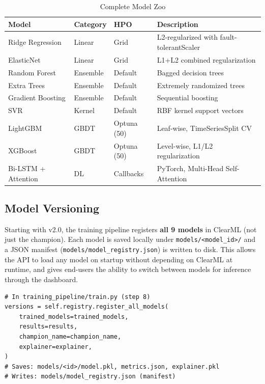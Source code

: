 \documentclass[12pt, a4paper, oneside]{article}
\begin{document}
\begin{table}[H]
\centering
\caption{Complete Model Zoo}
\label{tab:models}
\begin{tabularx}{\textwidth}{l l l X}
\toprule
\textbf{Model} & \textbf{Category} & \textbf{HPO} & \textbf{Description} \\
\midrule
Ridge Regression & Linear & Grid & L2-regularized with fault-tolerantScaler \\
ElasticNet & Linear & Grid & L1+L2 combined regularization \\
Random Forest & Ensemble & Default & Bagged decision trees \\
Extra Trees & Ensemble & Default & Extremely randomized trees \\
Gradient Boosting & Ensemble & Default & Sequential boosting \\
SVR & Kernel & Default & RBF kernel support vectors \\
LightGBM & GBDT & Optuna (50) & Leaf-wise, TimeSeriesSplit CV \\
XGBoost & GBDT & Optuna (50) & Level-wise, L1/L2 regularization \\
Bi-LSTM + Attention & DL & Callbacks & PyTorch, Multi-Head Self-Attention \\
\bottomrule
\end{tabularx}
\end{table}

\subsection{Model Versioning}

Starting with v2.0, the training pipeline registers \textbf{all 9 models} in ClearML (not just the champion). Each model is saved locally under \texttt{models/<model\_id>/} and a JSON manifest (\texttt{models/model\_registry.json}) is written to disk. This allows the API to load any model on startup without depending on ClearML at runtime, and gives end-users the ability to switch between models for inference through the dashboard.

\begin{lstlisting}[caption={Multi-model registration in the training pipeline}]
# In training_pipeline/train.py (step 8)
versions = self.registry.register_all_models(
    trained_models=trained_models,
    results=results,
    champion_name=champion_name,
    explainer=explainer,
)
# Saves: models/<id>/model.pkl, metrics.json, explainer.pkl
# Writes: models/model_registry.json (manifest)
\end{lstlisting}
\end{document}
